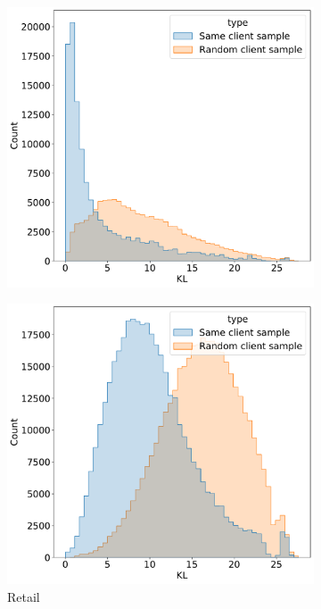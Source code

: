 \documentclass[sigconf, anonymous]{acmart}
\begin{document}
\begin{figure}
\begin{subfigure}{0.25\linewidth}
    \includegraphics[width=\linewidth]{figures/kl_dis_assessment.pdf}
  \end{subfigure}%
  \begin{subfigure}{0.25\linewidth}
    \caption{Retail}
    \includegraphics[width=\linewidth]{figures/kl_dis_retail.pdf}
  \end{subfigure}%
  \begin{subfigure}{0.25\linewidth}

\end{subfigure}
\end{figure}
\end{document}
